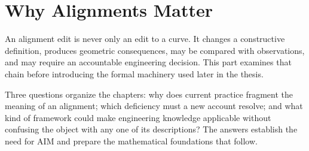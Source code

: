 
\chapter*{Why Alignments Matter}
{}

An alignment edit is never only an edit to a curve. It changes a constructive
definition, produces geometric consequences, may be compared with observations,
and may require an accountable engineering decision. This part examines that
chain before introducing the formal machinery used later in the thesis.

Three questions organize the chapters: why does current practice fragment the
meaning of an alignment; which deficiency must a new account resolve; and what
kind of framework could make engineering knowledge applicable without
confusing the object with any one of its descriptions? The answers establish
the need for AIM and prepare the mathematical foundations that follow.
